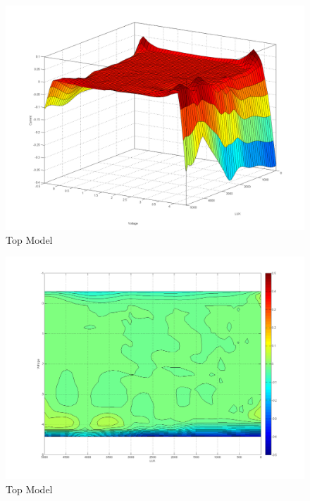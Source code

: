 \begin{figure}[H]
  \begin{center}
	  \includegraphics[width=\textwidth]{images/Diff_Contour}
	  \caption{Top Model }
	  \label{fig:Diff_Contour}
  \end{center}
\end{figure}

\begin{figure}[H]
  \begin{center}
	  \includegraphics[width=\textwidth]{images/Contour_map}
	  \caption{Top Model }
	  \label{fig:Contour_map}
  \end{center}
\end{figure}

